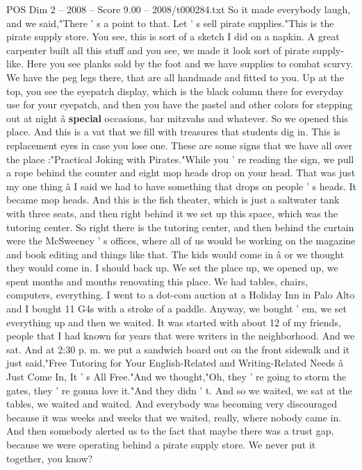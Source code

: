 \begin{textsample}{POS Dim 2 – 2008 – Score 9.00 – 2008/t000284.txt}
So it made everybody laugh, and we said,"There ' s a point to that.
Let ' s sell pirate supplies."This is the pirate supply store.
You see, this is sort of a sketch I did on a napkin.
A great carpenter built all this stuff and you see, we made it look sort of pirate supply-like.
Here you see planks sold by the foot and we have supplies to combat scurvy.
We have the peg legs there, that are all handmade and fitted to you.
Up at the top, you see the eyepatch display, which is the black column there for everyday use for your eyepatch, and then you have the pastel and other colors for stepping out at night â \textbf{special} occasions, bar mitzvahs and whatever.
So we opened this place.
And this is a vat that we fill with treasures that students dig in.
This is replacement eyes in case you lose one.
These are some signs that we have all over the place :"Practical Joking with Pirates."While you ' re reading the sign, we pull a rope behind the counter and eight mop heads drop on your head.
That was just my one thing â I said we had to have something that drops on people ' s heads.
It became mop heads.
And this is the fish theater, which is just a saltwater tank with three seats, and then right behind it we set up this space, which was the tutoring center.
So right there is the tutoring center, and then behind the curtain were the McSweeney ' s offices, where all of us would be working on the magazine and book editing and things like that.
The kids would come in â or we thought they would come in.
I should back up.
We set the place up, we opened up, we spent months and months renovating this place.
We had tables, chairs, computers, everything.
I went to a dot-com auction at a Holiday Inn in Palo Alto and I bought 11 G4s with a stroke of a paddle.
Anyway, we bought ' em, we set everything up and then we waited.
It was started with about 12 of my friends, people that I had known for years that were writers in the neighborhood.
And we sat.
And at 2:30 p. m. we put a sandwich board out on the front sidewalk and it just said,"Free Tutoring for Your English-Related and Writing-Related Needs â Just Come In, It ' s All Free."And we thought,"Oh, they ' re going to storm the gates, they ' re gonna love it."And they didn ' t.
And so we waited, we sat at the tables, we waited and waited.
And everybody was becoming very discouraged because it was weeks and weeks that we waited, really, where nobody came in.
And then somebody alerted us to the fact that maybe there was a trust gap, because we were operating behind a pirate supply store.
We never put it together, you know?

\end{textsample}
